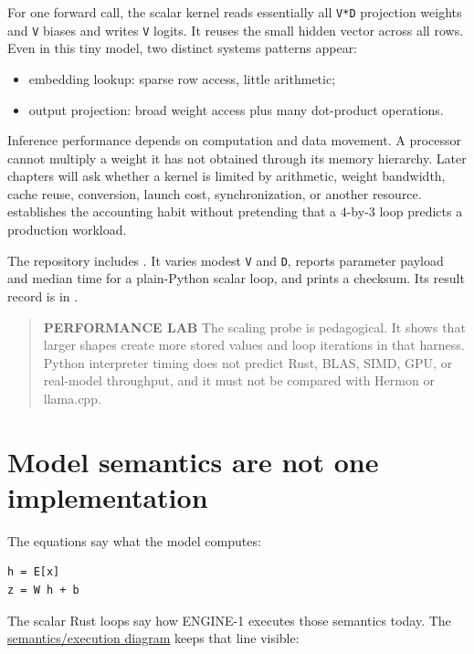 For one forward call, the scalar kernel reads essentially all
\texttt{V*D} projection weights and \texttt{V} biases and writes
\texttt{V} logits. It reuses the small hidden vector across all rows.
Even in this tiny model, two distinct systems patterns appear:

\begin{itemize}
\tightlist
\item
  embedding lookup: sparse row access, little arithmetic;
\item
  output projection: broad weight access plus many dot-product
  operations.
\end{itemize}

Inference performance depends on computation and data movement. A
processor cannot multiply a weight it has not obtained through its
memory hierarchy. Later chapters will ask whether a kernel is limited by
arithmetic, weight bandwidth, cache reuse, conversion, launch cost,
synchronization, or another resource.  establishes the
accounting habit without pretending that a 4-by-3 loop predicts a
production workload.

The repository includes
\texttt{}.
It varies modest \texttt{V} and \texttt{D}, reports parameter payload
and median time for a plain-Python scalar loop, and prints a checksum.
Its result record is in
\texttt{}.

\begin{quote}
\textbf{PERFORMANCE LAB} The scaling probe is pedagogical. It shows that
larger shapes create more stored values and loop iterations in that
harness. Python interpreter timing does not predict Rust, BLAS, SIMD,
GPU, or real-model throughput, and it must not be compared with Hermon
or llama.cpp.
\end{quote}

\section{Model semantics are not one
implementation}\label{model-semantics-are-not-one-implementation}

The equations say what the model computes:

\begin{verbatim}
h = E[x]
z = W h + b
\end{verbatim}

The scalar Rust loops say how ENGINE-1 executes those semantics today.
The
\href{https://github.com/hermonai/inside-the-llm-engine/blob/astra-visual-rewrite/diagrams/model/semantics-vs-execution.txt}{semantics/execution
diagram} keeps that line visible:

